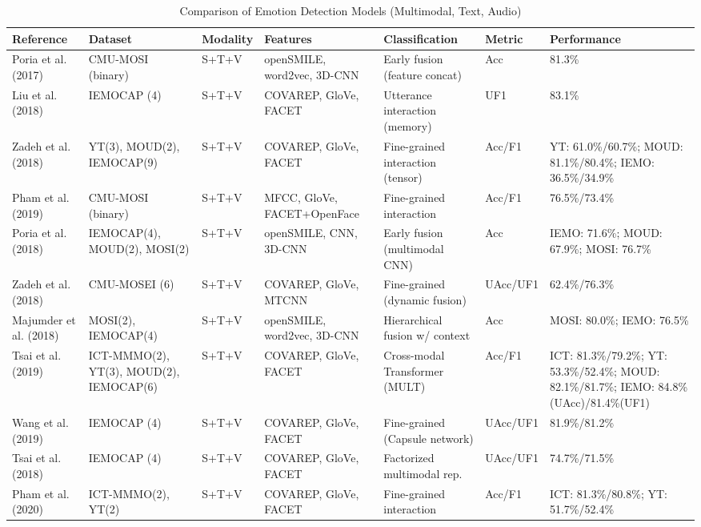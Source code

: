 \documentclass[12pt]{article}
\begin{document}
\clearpage
\begin{table}[p]
\sffamily\tiny
\centering
\caption{Comparison of Emotion Detection Models (Multimodal, Text, Audio)}
\renewcommand{\arraystretch}{0.85}
\setlength{\tabcolsep}{1.8pt}
\begin{adjustbox}{width=\textwidth,center}
\begin{tabular}{@{}p{2.3cm}p{1.6cm}p{1.2cm}p{2.4cm}p{2.3cm}p{1.1cm}p{2.1cm}@{}}
\toprule
\textbf{Reference} & \textbf{Dataset} & \textbf{Modality} & \textbf{Features} & \textbf{Classification} & \textbf{Metric} & \textbf{Performance} \\
\midrule
Poria et al. (2017) & CMU-MOSI (binary) & S+T+V & openSMILE, word2vec, 3D-CNN & Early fusion (feature concat) & Acc & 81.3\% \\
Liu et al. (2018) & IEMOCAP (4) & S+T+V & COVAREP, GloVe, FACET & Utterance interaction (memory) & UF1 & 83.1\% \\
Zadeh et al. (2018) & YT(3), MOUD(2), IEMOCAP(9) & S+T+V & COVAREP, GloVe, FACET & Fine-grained interaction (tensor) & Acc/F1 & YT: 61.0\%/60.7\%; MOUD: 81.1\%/80.4\%; IEMO: 36.5\%/34.9\% \\
Pham et al. (2019) & CMU-MOSI (binary) & S+T+V & MFCC, GloVe, FACET+OpenFace & Fine-grained interaction & Acc/F1 & 76.5\%/73.4\% \\
Poria et al. (2018) & IEMOCAP(4), MOUD(2), MOSI(2) & S+T+V & openSMILE, CNN, 3D-CNN & Early fusion (multimodal CNN) & Acc & IEMO: 71.6\%; MOUD: 67.9\%; MOSI: 76.7\% \\
Zadeh et al. (2018) & CMU-MOSEI (6) & S+T+V & COVAREP, GloVe, MTCNN & Fine-grained (dynamic fusion) & UAcc/UF1 & 62.4\%/76.3\% \\
Majumder et al. (2018) & MOSI(2), IEMOCAP(4) & S+T+V & openSMILE, word2vec, 3D-CNN & Hierarchical fusion w/ context & Acc & MOSI: 80.0\%; IEMO: 76.5\% \\
Tsai et al. (2019) & ICT-MMMO(2), YT(3), MOUD(2), IEMOCAP(6) & S+T+V & COVAREP, GloVe, FACET & Cross-modal Transformer (MULT) & Acc/F1 & ICT: 81.3\%/79.2\%; YT: 53.3\%/52.4\%; MOUD: 82.1\%/81.7\%; IEMO: 84.8\%(UAcc)/81.4\%(UF1) \\
Wang et al. (2019) & IEMOCAP (4) & S+T+V & COVAREP, GloVe, FACET & Fine-grained (Capsule network) & UAcc/UF1 & 81.9\%/81.2\% \\
Tsai et al. (2018) & IEMOCAP (4) & S+T+V & COVAREP, GloVe, FACET & Factorized multimodal rep. & UAcc/UF1 & 74.7\%/71.5\% \\
Pham et al. (2020) & ICT-MMMO(2), YT(2) & S+T+V & COVAREP, GloVe, FACET & Fine-grained interaction & Acc/F1 & ICT: 81.3\%/80.8\%; YT: 51.7\%/52.4\% \\

\end{tabular}
\end{adjustbox}
\end{table}
\end{document}
